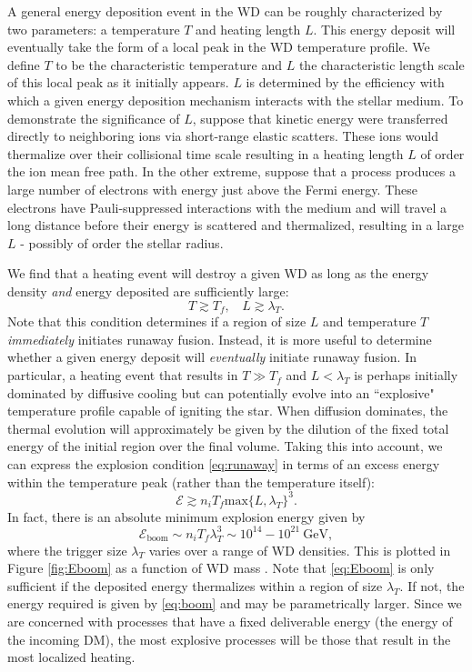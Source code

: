 \documentclass[twocolumn,showpacs,preprintnumbers,amsmath,amssymb,prd]{revtex4}
\newcommand{\GeV}{\text{GeV}}
\begin{document}
A general energy deposition event in the WD can be roughly characterized by two parameters: a temperature $T$ and heating length $L$. This energy deposit will eventually take the form of a local peak in the WD temperature profile. We define $T$ to be the characteristic temperature and $L$ the characteristic length scale of this local peak as it initially appears. $L$ is determined by the efficiency with which a given energy deposition mechanism interacts with the stellar medium. To demonstrate the significance of $L$, suppose that kinetic energy were transferred directly to neighboring ions via short-range elastic scatters. These ions would thermalize over their collisional time scale resulting in a heating length $L$ of order the ion mean free path. In the other extreme, suppose that a process produces a large number of electrons with energy just above the Fermi energy.  These electrons have Pauli-suppressed interactions with the medium and will travel a long distance before their energy is scattered and thermalized, resulting in a large $L$ - possibly of order the stellar radius.

We find that a heating event will destroy a given WD as long as the energy density \emph{and} energy deposited are sufficiently large:
\begin{equation}
\label{eq:runaway}
T \gtrsim T_f, ~~~~ L \gtrsim \lambda_T.
\end{equation}
Note that this condition determines if a region of size $L$ and temperature $T$ \emph{immediately} initiates runaway fusion.  Instead, it is more useful to determine whether a given energy deposit will \emph{eventually} initiate runaway fusion. In particular, a heating event that results in $T \gg T_f$ and $L  < \lambda_T$ is perhaps initially dominated by diffusive cooling but can potentially evolve into an ``explosive" temperature profile capable of igniting the star. When diffusion dominates, the thermal evolution will approximately be given by the dilution of the fixed total energy of the initial region over the final volume. Taking this into account, we can express the explosion condition \eqref{eq:runaway} in terms of an excess energy within the temperature peak (rather than the temperature itself):
\begin{equation}
\label{eq:boom}
\mathcal{E} \gtrsim n_i T_f \text{max}\{L, \lambda_T\}^3.
\end{equation}
In fact, there is an absolute minimum explosion energy given by
\begin{equation}
\label{eq:Eboom}
\mathcal{E}_{\text{boom}} \sim n_i T_f \lambda_T^3 \sim 10^{14} - 10^{21} ~\GeV,
\end{equation}
where the trigger size $\lambda_T$ varies over a range of WD densities. This is plotted in Figure \ref{fig:Eboom} as a function of WD mass \cite{website}. Note that \eqref{eq:Eboom} is only sufficient if the deposited energy thermalizes within a region of size $\lambda_T$. If not, the energy required is given by \eqref{eq:boom} and may be parametrically larger. Since we are concerned with processes that have a fixed deliverable energy (the energy of the incoming DM), the most explosive processes will be those that result in the most localized heating. 
\end{document}
